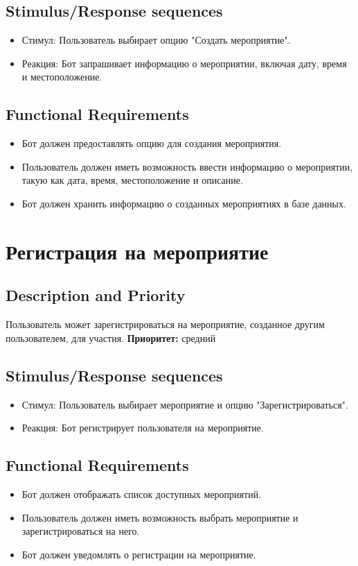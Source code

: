 \documentclass{scrreprt}
\begin{document}
\subsection{Stimulus/Response sequences}
\begin{itemize}
    \item Стимул: Пользователь выбирает опцию "Создать мероприятие".
    \item Реакция: Бот запрашивает информацию о мероприятии, включая дату, время и местоположение.
\end{itemize}

\subsection{Functional Requirements}
\begin{itemize}
    \item Бот должен предоставлять опцию для создания мероприятия.
    \item Пользователь должен иметь возможность ввести информацию о мероприятии, такую как дата, время, местоположение и описание.
    \item Бот должен хранить информацию о созданных мероприятиях в базе данных.
\end{itemize}

\section{Регистрация на мероприятие}

\subsection{Description and Priority}
Пользователь может зарегистрироваться на мероприятие, созданное другим пользователем, для участия.
\newline
\textbf{Приоритет:} средний

\subsection{Stimulus/Response sequences}
\begin{itemize}
    \item Стимул: Пользователь выбирает мероприятие и опцию "Зарегистрироваться".
    \item Реакция: Бот регистрирует пользователя на мероприятие.
\end{itemize}

\subsection{Functional Requirements}
\begin{itemize}
    \item Бот должен отображать список доступных мероприятий.
    \item Пользователь должен иметь возможность выбрать мероприятие и зарегистрироваться на него.
    \item Бот должен уведомлять о регистрации на мероприятие.
\end{itemize}
\end{document}
